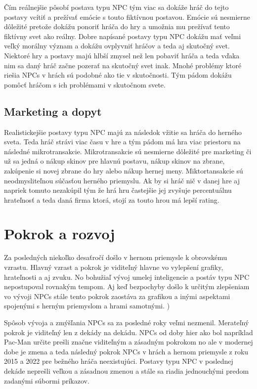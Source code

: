 \documentclass[10pt,twoside,slovak,a4paper]{article}
\begin{document}
Čím reálnejšie pôsobí postava typu NPC tým viac sa dokáže hráč do tejto postavy vcítiť a prežívať emócie s touto fiktívnou postavou. Emócie sú nesmierne dôležité pretože dokážu ponoriť hráča do hry a umožnia mu prežívať tento fiktívny svet ako reálny. Dobre napísané postavy typu NPC dokážu mať veľmi veľký morálny význam a dokážu ovplyvniť hráčov a teda aj skutočný svet. Niektoré hry a postavy majú hlbší zmysel než len pobaviť hráča a teda vďaka nim sa daný hráč začne pozerať na skutočný svet inak. Mnohé problémy ktoré riešia NPCs v hrách sú podobné ako tie v skutočnosti. Tým pádom dokážu pomôcť hráčom s ich problémami v skutočnom svete. 

\subsection{Marketing a dopyt}
Realistickejšie postavy typu NPC majú za následok vžitie sa hráča do herného sveta. Teda hráč strávi viac času v hre a tým pádom má hra viac priestoru na následné mikrotransakcie. Mikrotransakcie sú nesmierne dôležité pre marketing či už sa jedná o nákup skinov pre hlavnú postavu, nákup skinov na zbrane, zakúpenie si novej zbrane do hry alebo nákup hernej meny. Miktortansakcie sú neodmysliteľnou súčasťou herného priemyslu. 
Ak by si hráč nič v danej hre aj napriek tomuto nezakúpil tým že hrá hru častejšie jej zvyšuje percentuálnu hrateľnosť a teda daná firma ktorá, stojí za touto hrou má lepší rating.



\section{Pokrok a rozvoj}  \label{Rozvoj}

Za posledných niekoľko desaťročí došlo v hernom priemysle k obrovskému vzrastu. Hlavný vzrast a pokrok je viditeľný hlavne vo vylepšení grafiky, hrateľnosti a aj zvuku. No bohužiaľ vývoj umelej inteligencie a postáv typu NPC nepostupoval rovnakým tempom. Aj keď bezpochyby došlo k určitým zlepšeniam vo vývoji NPCs stále tento pokrok zaostáva za grafikou a inými aspektami spojenými s herným priemyslom a hrami samotnými. \cite{phdthesis})

Spôsob vývoja a zmýšľania NPCs sa za posledné roky veľmi nezmenil. Merateľný pokrok je viditeľný len z dekády na dekádu. NPCs od doby hier ako bol napríklad Pac-Man určite prešli značne viditeľným a zásadným pokrokom no ale v modernej dobe je zmena a teda následný pokrok NPCs v hrách a hernom priemysle z roku 2015 a 2022 pre bežného hráča neexistujúci. Postavy typu NPC v poslednej dekáde neprešli veľkou a zásadnou zmenou a stále sa riadia jednouchými predom zadanými súbormi príkazov. \cite{9730383}  
\end{document}
